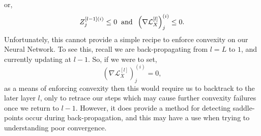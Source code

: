 \documentclass[11pt,twocolumn]{article}
\begin{document}
or,
\begin{equation}
Z_j^{[l-1](i)} \le 0 \hspace{0.2cm} \textrm{and} \hspace{0.2cm}  \left(\nabla \mathcal{L}^{[l]}_{X}\right)_j^{(i)} \le 0.
\end{equation}
Unfortunately, this cannot provide a simple recipe to enforce convexity on our Neural Network. To see this, recall we are back-propagating from $l=L$ to $1$, and currently updating at $l-1$. So, if we were to set, 
\begin{equation}
\left(\nabla \mathcal{L}^{[l]}_{X}\right)_j^{(i)} = 0,
\end{equation}
as a means of enforcing convexity then this would require us to backtrack to the later layer $l$, only to retrace our steps which may cause further convexity failures once we return to $l-1$. However, it does provide a method for detecting saddle-points occur during back-propagation, and this may have a use when trying to understanding poor convergence.
\end{document}
